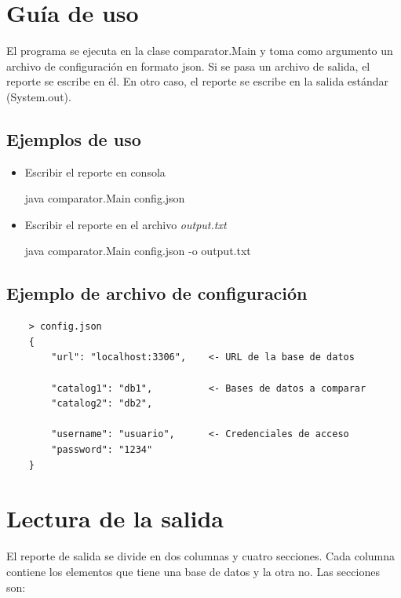 \documentclass[11pt]{article}
\begin{document}
\section{Guía de uso}

El programa se ejecuta en la clase comparator.Main y toma como argumento un archivo de configuración en formato json. Si se pasa un archivo de salida, el reporte se escribe en él. En otro caso, el reporte se escribe en la salida estándar (System.out).

\subsection{Ejemplos de uso}

\begin{itemize}
	\item Escribir el reporte en consola
	      \begin{verbatim*}java comparator.Main config.json\end{verbatim*}
	\item Escribir el reporte en el archivo \textit{output.txt}
	      \begin{verbatim*}java comparator.Main config.json -o output.txt\end{verbatim*}
\end{itemize}


\subsection{Ejemplo de archivo de configuración}

\begin{verbatim}
	> config.json
	{
	    "url": "localhost:3306",    <- URL de la base de datos

	    "catalog1": "db1",          <- Bases de datos a comparar
	    "catalog2": "db2",

	    "username": "usuario",      <- Credenciales de acceso
	    "password": "1234"
	}
\end{verbatim}

\section{Lectura de la salida}

El reporte de salida se divide en dos columnas y cuatro secciones. Cada columna contiene los elementos que tiene una base de datos y la otra no. Las secciones son:
\end{document}

